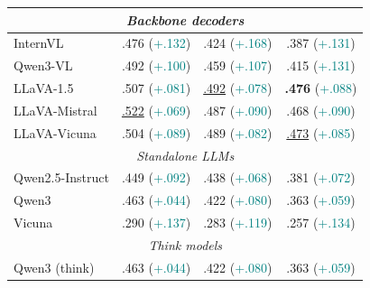 \begin{table}[t]
\begin{tabular}{lccc}
\midrule
\multicolumn{4}{c}{\textit{Backbone decoders}} \\
\midrule
InternVL & .476 {\scriptsize (\textcolor{teal}{+.132})} & .424 {\scriptsize (\textcolor{teal}{+.168})} & .387 {\scriptsize (\textcolor{teal}{+.131})} \\
Qwen3-VL & .492 {\scriptsize (\textcolor{teal}{+.100})} & .459 {\scriptsize (\textcolor{teal}{+.107})} & .415 {\scriptsize (\textcolor{teal}{+.131})} \\
LLaVA-1.5 & .507 {\scriptsize (\textcolor{teal}{+.081})} & \underline{.492} {\scriptsize (\textcolor{teal}{+.078})} & \textbf{.476} {\scriptsize (\textcolor{teal}{+.088})} \\
LLaVA-Mistral & \underline{.522} {\scriptsize (\textcolor{teal}{+.069})} & .487 {\scriptsize (\textcolor{teal}{+.090})} & .468 {\scriptsize (\textcolor{teal}{+.090})} \\
LLaVA-Vicuna & .504 {\scriptsize (\textcolor{teal}{+.089})} & .489 {\scriptsize (\textcolor{teal}{+.082})} & \underline{.473} {\scriptsize (\textcolor{teal}{+.085})} \\
\midrule
\multicolumn{4}{c}{\textit{Standalone LLMs}} \\
\midrule
Qwen2.5-Instruct & .449 {\scriptsize (\textcolor{teal}{+.092})} & .438 {\scriptsize (\textcolor{teal}{+.068})} & .381 {\scriptsize (\textcolor{teal}{+.072})} \\
Qwen3 & .463 {\scriptsize (\textcolor{teal}{+.044})} & .422 {\scriptsize (\textcolor{teal}{+.080})} & .363 {\scriptsize (\textcolor{teal}{+.059})} \\
Vicuna & .290 {\scriptsize (\textcolor{teal}{+.137})} & .283 {\scriptsize (\textcolor{teal}{+.119})} & .257 {\scriptsize (\textcolor{teal}{+.134})} \\
\midrule
\multicolumn{4}{c}{\textit{Think models}} \\
\midrule
Qwen3 (think) & .463 {\scriptsize (\textcolor{teal}{+.044})} & .422 {\scriptsize (\textcolor{teal}{+.080})} & .363 {\scriptsize (\textcolor{teal}{+.059})} \\
\bottomrule
\end{tabular}
\end{table}
